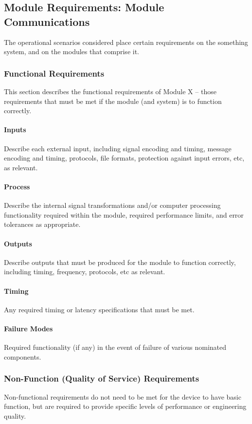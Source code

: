 \documentclass[MTRX3700report.tex]{subfiles}
\begin{document}
\subsection{Module Requirements: Module Communications}
The operational scenarios considered place certain requirements on the something system, and on the modules that comprise it.
\subsubsection{Functional Requirements}
This section describes the functional requirements of Module X – those requirements that must be met if the module (and system) is to function correctly.  

\paragraph{Inputs}
Describe each external input, including signal encoding and timing, message encoding and timing, protocols, file formats, protection against input errors, etc, as relevant.
\paragraph{Process}
Describe the internal signal transformations and/or computer processing functionality required within the module, required performance limits, and error tolerances as appropriate.
\paragraph{Outputs}
Describe outputs that must be produced for the module to function correctly, including timing, frequency, protocols, etc as relevant.
\paragraph{Timing}
Any required timing or latency specifications that must be met.
\paragraph{Failure Modes}
Required functionality (if any) in the event of failure of various nominated components.

\subsubsection{Non-Function (Quality of Service) Requirements}
Non-functional requirements do not need to be met for the device to have basic function, but are required to provide specific levels of performance or engineering quality.
\end{document}

